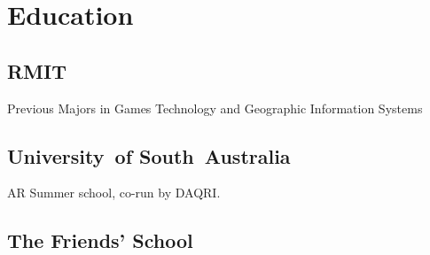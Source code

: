 \documentclass[a4paper]{deedy-resume} %
\begin{document}
\begin{minipage}[t]{0.33\textwidth} %


\section{Education}

\subsection{RMIT}

Previous Majors in Games Technology and Geographic Information Systems \\

\sectionspace %

\subsection{University\hbox{ }of South~Australia}

AR Summer school, co-run by DAQRI. \\

\sectionspace %


\subsection{The Friends' School}



\end{minipage}
\end{document}
